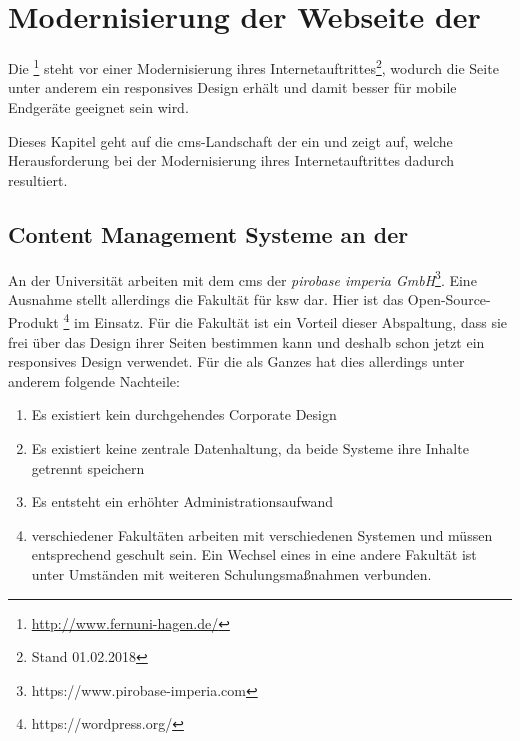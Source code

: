     \section{Modernisierung der Webseite der \fernUni}
        \label{chapter:FernUniRelaunch}
        Die \fernUni\footnote{\url{http://www.fernuni-hagen.de/}}
        steht vor einer Modernisierung ihres Internetauftrittes\footnote{Stand 01.02.2018},
        wodurch die Seite unter anderem ein responsives Design erhält und damit besser für
        mobile Endgeräte geeignet sein wird.

        Dieses Kapitel geht auf die \gls{cms}-Landschaft der \fernUni ein und zeigt auf,
        welche Herausforderung bei der Modernisierung ihres Internetauftrittes dadurch resultiert. 

        \subsection{Content Management Systeme an der \fernUni}
            An der Universität arbeiten \editors mit dem \gls{cms} \textit{\imperia}
            der \textit{pirobase imperia GmbH}\footnote{https://www.pirobase-imperia.com}.
            Eine Ausnahme stellt allerdings die Fakultät für \gls{ksw} dar.
            Hier ist das Open-Source-Produkt \textit{\wordpress}\footnote{https://wordpress.org/} im Einsatz.
            Für die Fakultät ist ein Vorteil dieser Abspaltung,
            dass sie frei über das Design ihrer Seiten bestimmen kann
            und deshalb schon jetzt ein responsives Design verwendet.
            Für die \fernUni als Ganzes hat dies allerdings unter anderem folgende Nachteile:

            \begin{enumerate}
                \item   Es existiert kein durchgehendes Corporate Design
                \item   Es existiert keine zentrale Datenhaltung, da beide Systeme ihre Inhalte getrennt speichern
                \item   Es entsteht ein erhöhter Administrationsaufwand
                \item   \editors verschiedener Fakultäten arbeiten mit verschiedenen Systemen und müssen entsprechend geschult sein.
                        Ein Wechsel eines \editors in eine andere Fakultät ist unter Umständen mit weiteren Schulungsmaßnahmen verbunden.
            \end{enumerate}

